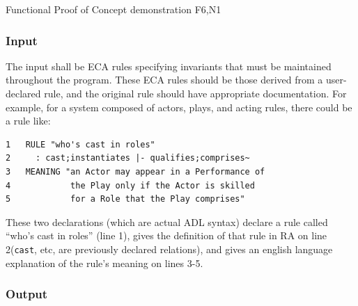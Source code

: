 \documentclass[12pt]{report}
\begin{document}



{Functional}
{Proof of Concept demonstration}
{F6,N1}


\vspace{-12pt}\subsubsection*{Input}

The input shall be ECA rules specifying invariants that must be maintained
throughout the program. These ECA rules should be those derived from a
user-declared rule, and the original rule should have appropriate documentation.
For example, for a system composed of actors, plays, and acting rules, there
could be a rule like:

\begin{verbatim}
1   RULE "who's cast in roles" 
2     : cast;instantiates |- qualifies;comprises~
3   MEANING "an Actor may appear in a Performance of 
4            the Play only if the Actor is skilled
5            for a Role that the Play comprises"
\end{verbatim}

These two declarations (which are actual ADL syntax) declare a rule called
``who's cast in roles'' (line 1), gives the definition of that rule in RA on line 2(\verb|cast|,
etc, are previously declared relations), and gives an english language
explanation of the rule's meaning on lines 3-5.

\vspace{-12pt}\subsubsection*{Output}
\end{document}
